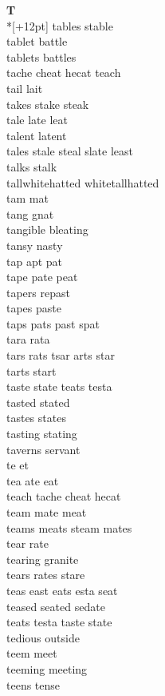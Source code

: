 \vspace{14pt}
\noindent\textbf{\Large T}\\*[+12pt]
tables stable\\
tablet battle\\
tablets battles\\
tache cheat hecat teach\\
tail lait\\
takes stake steak\\
tale late leat\\
talent latent\\
tales stale steal slate least\\
talks stalk\\
tallwhitehatted whitetallhatted\\
tam mat\\
tang gnat\\
tangible bleating\\
tansy nasty\\
tap apt pat\\
tape pate peat\\
tapers repast\\
tapes paste\\
taps pats past spat\\
tara rata\\
tars rats tsar arts star\\
tarts start\\
taste state teats testa\\
tasted stated\\
tastes states\\
tasting stating\\
taverns servant\\
te et\\
tea ate eat\\
teach tache cheat hecat\\
team mate meat\\
teams meats steam mates\\
tear rate\\
tearing granite\\
tears rates stare\\
teas east eats esta seat\\
teased seated sedate\\
teats testa taste state\\
tedious outside\\
teem meet\\
teeming meeting\\
teens tense\\
